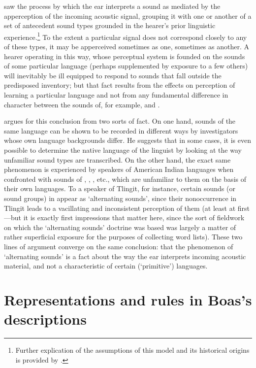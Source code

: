 {\Boas} saw the process by which the ear interprets a sound as mediated
by the apperception of the incoming acoustic signal, grouping it with
one or another of a set of antecedent sound types grounded in the
hearer's prior linguistic experience.\footnote{Further explication of the
assumptions of this model and its historical origins is provided by
\citet{mackert94:boas}.} To the extent a particular
signal does not correspond closely to any of these types, it may be
apperceived sometimes as one, sometimes as another.  A hearer
operating in this way, whose perceptual system is founded on the
sounds of some particular language (perhaps supplemented by exposure
to a few others) will inevitably be ill equipped to respond to sounds
that fall outside the predisposed inventory; but that fact results
from the effects on perception of learning a particular language and
not from any fundamental difference in character between the sounds
of, for example,  and . 

{\Boas} argues for this conclusion from two sorts of fact. On one hand,
sounds of the same language can be shown to be recorded in different
ways by investigators whose own language backgrounds differ. He
suggests that in some cases, it is even possible to determine the
native language of the linguist by looking at the way unfamiliar sound
types are transcribed. On the other hand, the exact same phenomenon is
experienced by speakers of American Indian languages when confronted
with sounds of , , , etc., which are unfamiliar to
them on the basis of their own languages. To a speaker of Tlingit, for
instance, certain sounds (or sound groups) in  appear as
`alternating sounds', since their nonoccurrence in Tlingit leads to a
vacillating and inconsistent perception of them (at least at first—but
it is exactly first impressions that matter here, since the sort of
fieldwork on which the `alternating sounds' doctrine was based was
largely a matter of rather superficial exposure for the purposes of
collecting word lists). These two lines of argument converge on the
same conclusion: that the phenomenon of `alternating sounds' is a fact
about the way the ear interprets incoming acoustic material, and not a
characteristic of certain (`primitive') languages.

\section{Representations and rules in Boas's descriptions}


